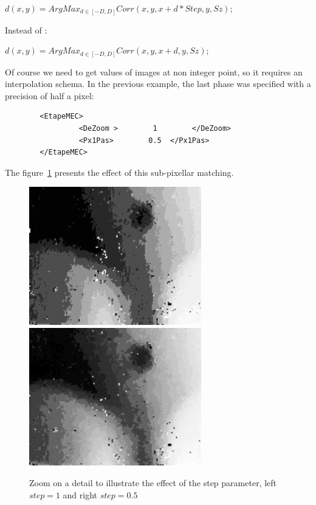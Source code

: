     $d(x,y) = ArgMax_{d\in[-D,D]} Corr(x,y,x+d*Step,y,Sz)$;

Instead of :

     $d(x,y) = ArgMax_{d\in[-D,D]} Corr(x,y,x+d,y,Sz)$;

Of course we need to get values of images at non integer point, so
it requires an interpolation schema. In the previous example, the last phase
was specified with a precision of half a pixel:


{\scriptsize
\begin{verbatim}
        <EtapeMEC>
                 <DeZoom >        1        </DeZoom>
                 <Px1Pas>        0.5  </Px1Pas>
        </EtapeMEC>
\end{verbatim}
}


The figure~\ref{FIG:DISP:PB:DISC} presents the effect
of this sub-pixellar matching.

\begin{figure}
\begin{center}
\includegraphics[height=60mm]{FIGS/Boudhas/Px1-Num4-PbDisc.jpg}
\includegraphics[height=60mm]{FIGS/Boudhas/Px1-Num5-PbDisc.jpg}
\caption{Zoom on a detail to illustrate the effect of the step parameter, left $step=1$ and right $step=0.5$}
\label{FIG:DISP:PB:DISC}
\end{center}
\end{figure}

